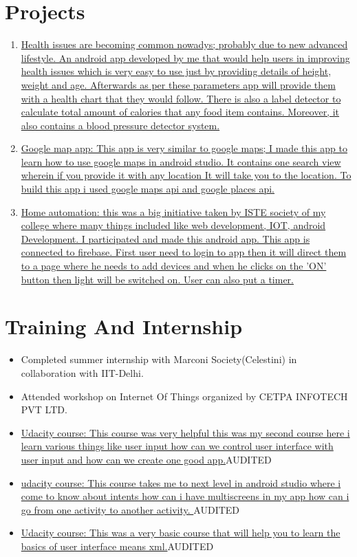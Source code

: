\documentclass{article}
\begin{document}
	\section{Projects}
		\begin{enumerate}
			\item \href{https://github.com/jindalshiva/heart}{ Health issues are becoming common nowadys; probably due to new advanced lifestyle. An android app developed by me that would help users in improving health issues which is very easy to use just by providing details of height, weight and age. Afterwards as per these parameters app will provide them with a health chart that they would follow. There is also a label detector to calculate total amount of calories that any food item contains. Moreover, it also contains a blood pressure detector system.}
			\item \href{https://github.com/jindalshiva/GooglePlacesGoogleMaps} { Google map app: This app is very similar to google maps; I made this app to learn how to use google maps in android studio. It contains one search view wherein if you provide it with any location It will take you to the location. To build this app i used google maps api and google places api.}
			\item \href{https://github.com/jindalshiva/ISTY_1.2.3-master-master} { Home automation: this was a big initiative taken by ISTE society of my college where many things included like web development, IOT, android Development. I participated and made this android app. This app is connected to firebase. First user need to login to app then it will direct them to a page where he needs to add devices and when he clicks on the 'ON' button then light will be switched on. User can also put a timer.}

		\end{enumerate}
	\section{Training And Internship}
		\begin{itemize}
			\item {Completed summer internship with Marconi Society(Celestini) in collaboration with IIT-Delhi.}
			\item {Attended workshop on Internet Of Things organized by CETPA INFOTECH PVT LTD.}
			\item \href{https://classroom.udacity.com/courses/ud836}{Udacity course: This course was very helpful this was my second course here i learn various things like user input how can we control user interface with user input and how can we create one good app.}{AUDITED}
			\item \href{https://classroom.udacity.com/courses/ud839}{udacity course: This course takes me to next level in android studio where i come to know about intents how can i have multiscreens in my app how can i go from one activity to another activity. }{AUDITED}
			\item \href{https://classroom.udacity.com/courses/ud834}{Udacity course: This was a very basic course that will help you to learn the basics of user interface means xml.}{AUDITED}
		\end{itemize}
\end{document}
